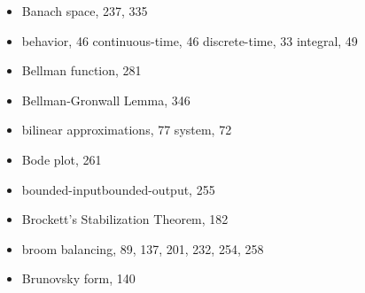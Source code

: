 \begin{itemize}
  \indexspace

  \item Banach space, 237, 335
  \item behavior, 46
    \subitem continuous-time, 46
    \subitem discrete-time, 33
    \subitem integral, 49
  \item Bellman function, 281
  \item Bellman-Gronwall Lemma, 346
  \item bilinear
    \subitem approximations, 77
    \subitem system, 72
  \item Bode plot, 261
  \item bounded-input\longentry bounded-output, 255
  \item Brockett's Stabilization Theorem, 182
  \item broom balancing, 89, 137, 201, 232, 254, 258
  \item Brunovsky form, 140

  \indexspace


\end{itemize}
